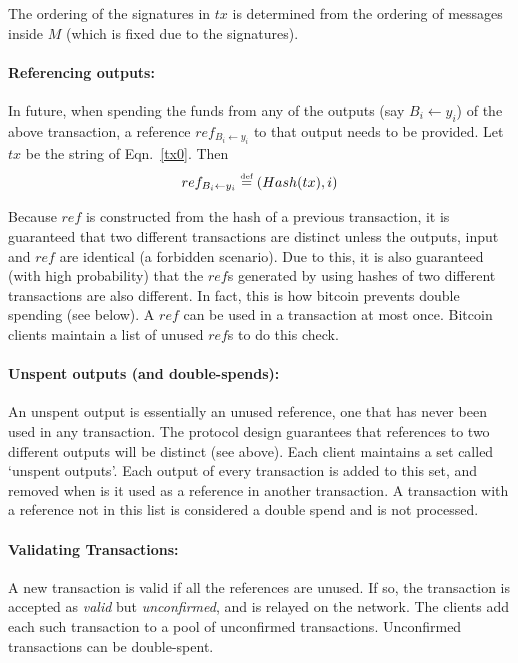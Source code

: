 \documentclass[]{report}   %
\newcommand{\la}{\leftarrow}
\newcommand{\defined}{\stackrel{\mbox{\tiny{def}}}{=}}
\begin{document}
The ordering of the signatures in $tx$ is determined from the ordering of messages inside $M$ (which is fixed due to the signatures).
\paragraph{Referencing outputs:} In future, when spending the funds from any of the outputs (say $B_i \la y_i$) of the above transaction, a reference $ref_{B_i\la y_i}$ to that output needs to be provided. %
Let $tx$ be the string of Eqn.~\ref{tx0}. Then \[ref_{B_i\la y_i}\defined (Hash(tx), i)\]

Because $ref$ is constructed from the hash of a previous transaction, it is guaranteed that two different transactions are distinct unless the outputs, input and $ref$ are identical (a forbidden scenario). Due to this, it is also guaranteed (with high probability) that the $ref$s generated by using hashes of two different transactions are also different. In fact, this is how bitcoin prevents double spending (see below). A $ref$ can be used in a transaction at most once. Bitcoin clients maintain a list of unused $ref$s to do this check.

\paragraph{Unspent outputs (and double-spends):} An unspent output is essentially an unused reference, one that has never been used in any transaction. The protocol design guarantees that references to two different outputs will be distinct (see above).
Each client maintains a set called `unspent outputs'. Each output of every transaction is added to this set, and removed when is it used as a reference in another transaction. A transaction with a reference not in this list is considered a double spend and is not processed. %


\paragraph{Validating Transactions:}
A new transaction is valid if all the references are unused. %
If so, the transaction is accepted as {\em valid} but {\em unconfirmed}, and is relayed on the network. The clients add each such transaction to a pool of unconfirmed transactions. Unconfirmed transactions can be double-spent. 
\end{document}
